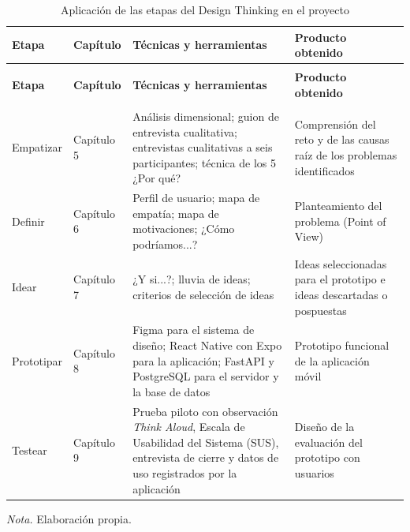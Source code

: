 \begin{longtable}{
  >{\raggedright\arraybackslash}p{}
  >{\raggedright\arraybackslash}p{}
  >{\raggedright\arraybackslash}p{}
  >{\raggedright\arraybackslash}p{}
}
\caption{Aplicación de las etapas del Design Thinking en el proyecto}\label{tab:dt_aplicacion}\\
\toprule
\textbf{Etapa} & \textbf{Capítulo} & \textbf{Técnicas y herramientas} & \textbf{Producto obtenido} \\
\midrule
\endfirsthead

\multicolumn{4}{l}{\textit{Tabla \thetable{} (continuación)}} \\[4pt]
\toprule
\textbf{Etapa} & \textbf{Capítulo} & \textbf{Técnicas y herramientas} & \textbf{Producto obtenido} \\
\midrule
\endhead

\midrule
\multicolumn{4}{r}{\textit{Continúa en la siguiente página}} \\
\endfoot

\bottomrule
\endlastfoot

Empatizar & Capítulo 5 &
Análisis dimensional; guion de entrevista cualitativa; entrevistas cualitativas a seis participantes; técnica de los 5 ¿Por qué? &
Comprensión del reto y de las causas raíz de los problemas identificados \\[6pt]

Definir & Capítulo 6 &
Perfil de usuario; mapa de empatía; mapa de motivaciones; ¿Cómo podríamos...? &
Planteamiento del problema (Point of View) \\[6pt]

Idear & Capítulo 7 &
¿Y si...?; lluvia de ideas; criterios de selección de ideas &
Ideas seleccionadas para el prototipo e ideas descartadas o pospuestas \\[6pt]

Prototipar & Capítulo 8 &
Figma para el sistema de diseño; React Native con Expo para la aplicación; FastAPI y PostgreSQL para el servidor y la base de datos &
Prototipo funcional de la aplicación móvil \\[6pt]

Testear & Capítulo 9 &
Prueba piloto con observación \textit{Think Aloud}, Escala de Usabilidad del Sistema (SUS), entrevista de cierre y datos de uso registrados por la aplicación &
Diseño de la evaluación del prototipo con usuarios \\

\end{longtable}
\vspace{-6pt}
\noindent\textit{Nota.} Elaboración propia.
